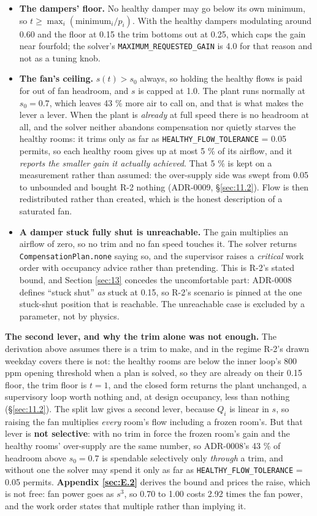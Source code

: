 \begin{itemize}
\tightlist
\item \textbf{The dampers' floor.} No healthy damper may go below its own minimum, so
  $t \ge \max_i(\text{minimum}_i / p_i)$. With the healthy dampers modulating around 0.60 and the
  floor at 0.15 the trim bottoms out at 0.25, which caps the gain near fourfold; the solver's
  \texttt{MAXIMUM\_REQUESTED\_GAIN} is 4.0 for that reason and not as a tuning knob.
\item \textbf{The fan's ceiling.} $s(t) > s_0$ always, so holding the healthy flows is paid for out
  of fan headroom, and $s$ is capped at 1.0. The plant runs normally at $s_0 = 0.7$, which leaves
  43 \% more air to call on, and that is what makes the lever a lever. When the plant is
  \emph{already} at full speed there is no headroom at all, and the solver neither abandons
  compensation nor quietly starves the healthy rooms: it trims only as far as
  \texttt{HEALTHY\_FLOW\_TOLERANCE} = 0.05 permits, so each healthy room gives up at most 5 \% of
  its airflow, and it \emph{reports the smaller gain it actually achieved}. That 5 \% is kept on a
measurement rather than assumed: the over-supply side was swept from 0.05 to unbounded and bought
R-2 nothing (ADR-0009, §\ref{sec:11.2}). Flow is then
  redistributed rather than created, which is the honest description of a saturated fan.
\item \textbf{A damper stuck fully shut is unreachable.} The gain multiplies an airflow of zero, so
  no trim and no fan speed touches it. The solver returns \texttt{CompensationPlan.none} saying so,
  and the supervisor raises a \emph{critical} work order with occupancy advice rather than
  pretending. This is R-2's stated bound, and Section \ref{sec:13} concedes the uncomfortable part: ADR-0008
  defines ``stuck shut'' \emph{as} stuck at 0.15, so R-2's scenario is pinned at the one stuck-shut
  position that is reachable. The unreachable case is excluded by a parameter, not by physics.
\end{itemize}

\textbf{The second lever, and why the trim alone was not enough.} The derivation above assumes there
is a trim to make, and in the regime R-2's drawn weekday covers there is not: the healthy rooms are
below the inner loop's 800 ppm opening threshold when a plan is solved, so they are already on their
0.15 floor, the trim floor is $t = 1$, and the closed form returns the plant unchanged, a
supervisory loop worth nothing and, at design occupancy, less than nothing (§\ref{sec:11.2}). The split law
gives a second lever, because $Q_i$ is linear in $s$, so raising the fan multiplies \emph{every}
room's flow including a frozen room's. But that lever is \textbf{not selective}: with no trim in
force the frozen room's gain and the healthy rooms' over-supply are the same number, so ADR-0008's
43 \% of headroom above $s_0 = 0.7$ is spendable selectively only \emph{through} a trim, and without
one the solver may spend it only as far as \texttt{HEALTHY\_FLOW\_TOLERANCE} = 0.05 permits.
\textbf{Appendix \ref{sec:E.2}} derives the bound and prices the raise, which is not free: fan power goes as
$s^3$, so 0.70 to 1.00 costs 2.92 times the fan power, and the work order states that multiple
rather than implying it.

